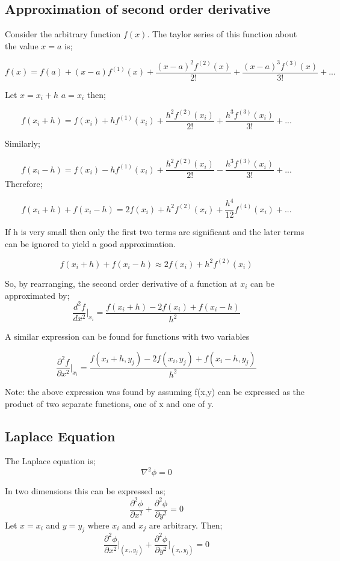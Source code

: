 \documentclass[a4paper,11pt]{article}
\begin{document}
\subsection{Approximation of second order derivative}
Consider the arbitrary function \(f(x)\). The taylor series of this function about the value \(x=a\) is;

\[f(x) = f(a) +(x-a)f^{(1)}(x)+\frac{(x-a)^{2}f^{(2)}(x)}{2!}+\frac{(x-a)^{3}f^{(3)}(x)}{3!}+...\]\vspace*{5mm}

Let \(x=x_i + h\) \(a=x_i\) then;

\[f(x_i+h)=f(x_i)+hf^{(1)}(x_i)+\frac{h^2f^{(2)}(x_i)}{2!}+\frac{h^3f^{(3)}(x_i)}{3!}+...\]

Similarly;

\[f(x_i-h)=f(x_i)-hf^{(1)}(x_i)+\frac{h^2f^{(2)}(x_i)}{2!}-\frac{h^3f^{(3)}(x_i)}{3!}+...\]
Therefore;

\[f(x_i+h)+f(x_i-h) = 2f(x_i) + h^2f^{(2)}(x_i) +\frac{h^4}{12}f^{(4)}(x_i)+...\]

If h is very small then only the first two terms are significant and the later terms can be ignored to yield a good approximation.

\[f(x_i+h)+f(x_i-h) \approx 2f(x_i) + h^2f^{(2)}(x_i)\]

So, by rearranging, the second order derivative of a function at \(x_i\) can be approximated by;
\[\frac{d^2f}{dx^2}\Bigg|_{x_i} = \frac{f(x_i+h)-2f(x_i)+f(x_i-h)}{h^2}\]

A similar expression can be found for functions with two variables

\[\frac{\partial^2f}{\partial x^2}\Bigg|_{x_i} = \frac{f(x_i+h,y_j)-2f(x_i,y_j)+f(x_i-h,y_j)}{h^2}\]

Note: the above expression was found by assuming f(x,y) can be expressed as the product of two separate functions, one of x and one of y. \\


\subsection{Laplace Equation}

The Laplace equation is;
\[\nabla^2\phi = 0\]

In two dimensions this can be expressed as;
\[\frac{\partial^2\phi}{\partial x^2} + \frac{\partial^2\phi}{\partial y^2} = 0\]
Let \(x=x_i\) and \(y=y_j\) where \(x_i\) and \(x_j\) are arbitrary. Then;
\[\frac{\partial^2\phi}{\partial x^2}\Bigg|_{(x_{i},y_{j})} + \frac{\partial^2\phi}{\partial y^2}\Bigg|_{(x_{i},y_{j})} = 0\]
\end{document}
